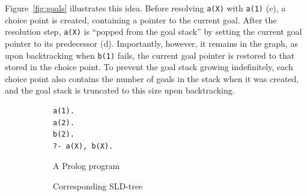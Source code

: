 Figure~\ref{fig:goals} illustrates this idea. Before resolving \texttt{a(X)} with \texttt{a(1)} (c), a choice point is created, containing a pointer to the current goal. After the resolution step, \texttt{a(X)} is ``popped from the goal stack'' by setting the current goal pointer to its predecessor (d). Importantly, however, it remains in the graph, as upon backtracking when \texttt{b(1)} fails, the current goal pointer is restored to that stored in the choice point. To prevent the goal stack growing indefinitely, each choice point also contains the number of goals in the stack when it was created, and the goal stack is truncated to this size upon backtracking.

\begin{figure}[H]
\centering
\begin{subfigure}{.5\textwidth}
\centering
\begin{verbatim}
a(1).
a(2).
b(2).
?- a(X), b(X).

\end{verbatim}
\caption{A Prolog program}
\end{subfigure}%
\begin{subfigure}{.5\textwidth}
\centering
{}
\caption{Corresponding SLD-tree}
\end{subfigure}
\par\bigskip
\par\bigskip
\begin{subfigure}{.5\textwidth}
\centering
{}
\end{subfigure}
\end{figure}
